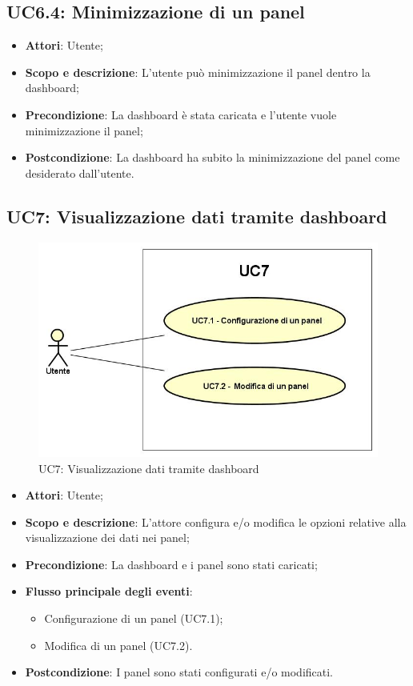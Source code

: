 \subsection{UC6.4: Minimizzazione di un panel}
\hypertarget{UC6.4}{}
\begin{itemize}
	\item \textbf{Attori}: Utente;
	\item \textbf{Scopo e descrizione}: L'utente può minimizzazione il panel dentro la dashboard;
	\item \textbf{Precondizione}: La dashboard è stata caricata e l'utente vuole minimizzazione il panel;
	\item \textbf{Postcondizione}: La dashboard ha subito la minimizzazione del panel come desiderato dall'utente.
\end{itemize}
\subsection{UC7: Visualizzazione dati tramite dashboard}
\hypertarget{UC7}{}
\begin{figure} [H]
	\centering
	\includegraphics[scale=0.45]{Img/UC7}
	\caption{UC7: Visualizzazione dati tramite dashboard}\label{}
\end{figure}
\begin{itemize}
	\item \textbf{Attori}: Utente;
	\item \textbf{Scopo e descrizione}: L'attore configura e/o modifica le opzioni relative alla visualizzazione dei dati nei panel;
	\item \textbf{Precondizione}: La dashboard e i panel sono stati caricati;
	\item \textbf{Flusso principale degli eventi}:
	\begin{itemize}
		\item Configurazione di un panel (UC7.1);
		\item Modifica di un panel (UC7.2).
	\end{itemize}
	\item \textbf{Postcondizione}: I panel sono stati configurati e/o modificati.
\end{itemize}
